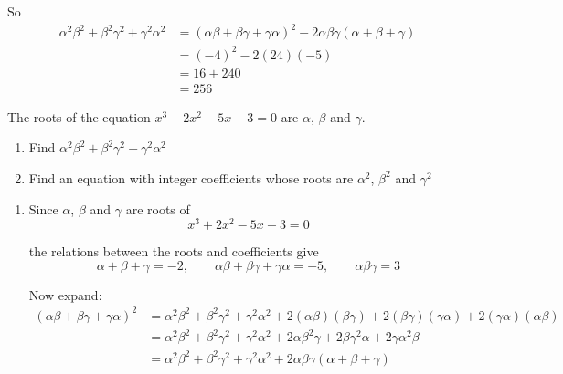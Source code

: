 \documentclass[leqno]{article}
\begin{document}
\begin{enumerate}[
  label=\textbf{\arabic*.},
  leftmargin=*,
  topsep=0pt,
  partopsep=0pt,
  parsep=0pt
]
\begin{djsSolution}
\begin{enumerate}[label=\textbf{(\alph*)}]
\begin{enumerate}[label=(\roman*)]
    So
    \begin{align*}
    \alpha^2\beta^2+\beta^2\gamma^2+\gamma^2\alpha^2
    &=(\alpha\beta+\beta\gamma+\gamma\alpha)^2-2\alpha\beta\gamma(\alpha+\beta+\gamma) \\
    &=(-4)^2-2(24)(-5) \\
    &=16+240 \\
    &=256
    \end{align*}
  \end{enumerate}
\end{enumerate}
\end{djsSolution}


\newpage

\questionitem

The roots of the equation $x^3 + 2x^2 - 5x - 3 = 0$ are $\alpha$, $\beta$ and $\gamma$. \\

\begin{enumerate}[label=\textbf{(\alph*)}]
  \item Find $\alpha^2\beta^2 + \beta^2\gamma^2 + \gamma^2\alpha^2$  \\
  \item Find an equation with integer coefficients whose roots are $\alpha^2$, $\beta^2$ and $\gamma^2$  \\
\end{enumerate}

\vspace*{10pt}

\begin{djsSolution}
\begin{enumerate}[label=\textbf{(\alph*)}]
  \item Since $\alpha$, $\beta$ and $\gamma$ are roots of
\[
x^3+2x^2-5x-3=0
\]

the relations between the roots and coefficients give
\[
\alpha+\beta+\gamma=-2,\qquad \alpha\beta+\beta\gamma+\gamma\alpha=-5,\qquad \alpha\beta\gamma=3
\]

Now expand:
\begin{align*}
(\alpha\beta+\beta\gamma+\gamma\alpha)^2
&=\alpha^2\beta^2+\beta^2\gamma^2+\gamma^2\alpha^2
   +2(\alpha\beta)(\beta\gamma)+2(\beta\gamma)(\gamma\alpha)+2(\gamma\alpha)(\alpha\beta)\\
&=\alpha^2\beta^2+\beta^2\gamma^2+\gamma^2\alpha^2
   +2\alpha\beta^2\gamma+2\beta\gamma^2\alpha+2\gamma\alpha^2\beta\\
&=\alpha^2\beta^2+\beta^2\gamma^2+\gamma^2\alpha^2
   +2\alpha\beta\gamma(\alpha+\beta+\gamma)
\end{align*}


\end{enumerate}
\end{djsSolution}
\end{enumerate}
\end{document}
